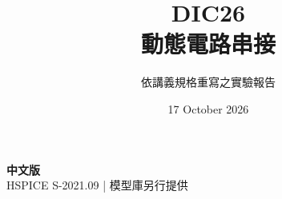 \documentclass[11pt,a4paper]{article}
\title{\color{accent}DIC26\\[4pt]動態電路串接}
\author{依講義規格重寫之實驗報告}
\date{17 October 2026}
\begin{document}
\maketitle
\begin{center}\small\textbf{中文版}\\
HSPICE S-2021.09 \quad | \quad 模型庫另行提供
\end{center}


\end{document}
